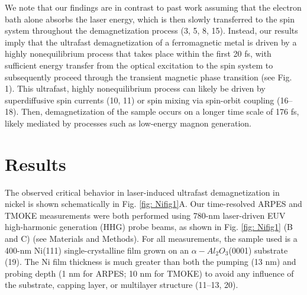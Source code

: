We note that our findings are in contrast to past work assuming that the electron bath alone absorbs the laser energy, which is then slowly transferred to the spin system throughout the demagnetization process (3, 5, 8, 15). Instead, our results imply that the ultrafast demagnetization of a ferromagnetic metal is driven by a highly nonequilibrium process that takes place within the first 20 fs, with sufficient energy transfer from the optical excitation to the spin system to subsequently proceed through the transient magnetic phase transition (see Fig. 1). This ultrafast, highly nonequilibrium process can likely be driven by superdiffusive spin currents (10, 11) or spin mixing via spin-orbit coupling (16–18). Then, demagnetization of the sample occurs on a longer time scale of 176 fs, likely mediated by processes such as low-energy magnon generation.

\section{Results}

The observed critical behavior in laser-induced ultrafast demagnetization in nickel is shown schematically in Fig. \ref{fig: Nifig1}A. Our time-resolved ARPES and TMOKE measurements were both performed using 780-nm laser-driven EUV high-harmonic generation (HHG) probe beams, as shown in Fig. \ref{fig: Nifig1} (B and C) (see Materials and Methods). For all measurements, the sample used is a 400-nm Ni(111) single-crystalline film grown on an $\alpha-Al_{2}O_{3}$(0001) substrate (19). The Ni film thickness is much greater than both the pumping (13 nm) and probing depth (1 nm for ARPES; 10 nm for TMOKE) to avoid any influence of the substrate, capping layer, or multilayer structure (11–13, 20). 

